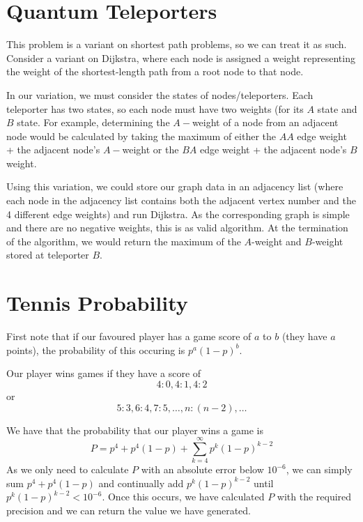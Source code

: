 \documentclass{article}
\begin{document}
\section{Quantum Teleporters}
This problem is a variant on shortest path problems, so we can treat it as such. Consider a variant on Dijkstra, where each node is assigned a weight representing the weight of the shortest-length path from a root node to that node.
\par 
In our variation, we must consider the states of nodes/teleporters. Each teleporter has two states, so each node must have two weights (for its $A$ state and $B$ state. For example, determining the $A-$weight of a node from an adjacent node would be calculated by taking the maximum of either the $AA$ edge weight + the adjacent node's $A-$weight or the $BA$ edge weight + the adjacent node's $B$ weight.
\par 
Using this variation, we could store our graph data in an adjacency list (where each node in the adjacency list contains both the adjacent vertex number and the 4 different edge weights) and run Dijkstra. As the corresponding graph is simple and there are no negative weights, this is as valid algorithm. At the termination of the algorithm, we would return the maximum of the $A$-weight and $B$-weight stored at teleporter $B$.


\section{Tennis Probability}
First note that if our favoured player has a game score of $a$ to $b$ (they have $a$ points), the probability of this occuring is $p^a(1-p)^b$.
\par 
Our player wins games if they have a score of 
\[4:0, 4:1,4:2\]
or 
\[5:3, 6:4,7:5,\dots, n:(n-2), \dots\]
\par 
We have that the probability that our player wins a game is 
\[P=p^4+p^4(1-p)+\sum^{\infty}_{k=4}{p^k(1-p)^{k-2}}\]
As we only need to calculate $P$ with an absolute error below $10^{-6}$, we can simply sum
$p^4+p^4(1-p)$ and continually add $p^k(1-p)^{k-2}$ until $p^k(1-p)^{k-2}<10^{-6}$. Once this occurs, we have calculated $P$ with the required precision and we can return the value we have generated.
\end{document}

